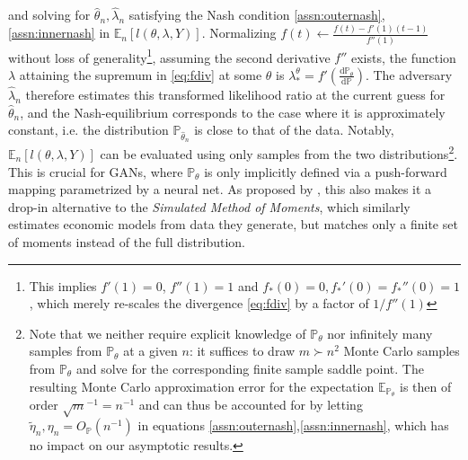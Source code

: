 \documentclass[12pt]{article}
\def\D{\mathrm{d}}
\theoremstyle{myplain}
\theoremstyle{definition}
\theoremstyle{definition}
\theoremstyle{remark}
\numberwithin{equation}{section}
\begin{document}
and solving for $\widehat\theta_n, \widehat\lambda_n$ satisfying the Nash condition \ref{assn:outernash},\ref{assn:innernash} in $\mathbb{E}_n[l(\theta, \lambda, Y)]$. Normalizing $f(t) \gets \frac{f(t)-f'(1)(t-1)}{f''(1)}$ without loss of generality\footnote{This implies $f'(1)=0$, $f''(1)=1$ and $f_*(0)=0, f_*'(0)=f_*''(0)=1$, which merely re-scales the divergence \ref{eq:fdiv} by a factor of $1/f''(1)$}, assuming the second derivative $f''$ exists, the function $\lambda$ attaining the supremum in \ref{eq:fdiv} at some $\theta$ is $\lambda_*^\theta=f'(\frac{\D\mathbb{P}_\theta}{\D\mathbb{P}})$. The adversary $\widehat\lambda_n$ therefore estimates this transformed likelihood ratio at the current guess for $\widehat\theta_n$, and the Nash-equilibrium corresponds to the case where it is approximately constant, i.e. the distribution $\mathbb{P}_{\widehat\theta_n}$ is close to that of the data. Notably, $\mathbb{E}_n[l(\theta, \lambda, Y)]$ can be evaluated using only samples from the two distributions\footnote{Note that we neither require explicit knowledge of $\mathbb{P}_{\theta}$ nor infinitely many samples from $\mathbb{P}_{\theta}$ at a given $n$: it suffices to draw $m \succ n^2$ Monte Carlo samples from $\mathbb{P}_{\theta}$ and solve for the corresponding finite sample saddle point. The resulting Monte Carlo approximation error for the expectation $\mathbb{E}_{\mathbb{P}_{\theta}}$ is then of order $\sqrt{m}^{-1}=n^{-1}$ and can thus be accounted for by letting $\widetilde\eta_n, \eta_n=O_\mathbb{P}(n^{-1})$ in equations \ref{assn:outernash},\ref{assn:innernash}, which has no impact on our asymptotic results.}. This is crucial for GANs, where $\mathbb{P}_\theta$ is only implicitly defined via a push-forward mapping parametrized by a neural net. As proposed by \cite{kaji2020adversarial}, this also makes it a drop-in alternative to the {\it Simulated Method of Moments}, which similarly estimates economic models from data they generate, but matches only a finite set of moments instead of the full distribution. \\
\end{document}
